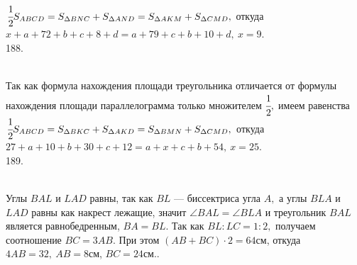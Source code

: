 \documentclass[12pt]{article}
\begin{document}
$\cfrac{1}{2}S_{ABCD}=S_{\Delta BNC}+S_{\Delta AND}=S_{\Delta AKM}+S_{\Delta CMD},$ откуда $x+a+72+b+c+8+d=a+79+c+b+10+d,\ x=9.$\\
188. \begin{figure}[ht!]
\end{figure}\\
Так как формула нахождения площади треугольника отличается от формулы нахождения площади параллелограмма только множителем $\cfrac{1}{2},$ имеем равенства
$\cfrac{1}{2}S_{ABCD}=S_{\Delta BKC}+S_{\Delta AKD}=S_{\Delta BMN}+S_{\Delta CMD},$ откуда $27+a+10+b+30+c+12=a+x+c+b+54,\ x=25.$\\
189. \begin{figure}[ht!]
\end{figure}\\
Углы $BAL$ и $LAD$ равны, так как $BL$ --- биссектриса угла $A,$ а углы $BLA$ и $LAD$ равны как накрест лежащие, значит $\angle BAL=\angle BLA$ и треугольник $BAL$ является равнобедренным, $BA=BL.$ Так как $BL:LC=1:2,$ получаем соотношение $BC=3AB.$ При этом $(AB+BC)\cdot2=64$см, откуда $4AB=32,\ AB=8$см, $BC=24$см.\newpage{}. \begin{figure}[ht!]
\end{figure}\\
\end{document}
